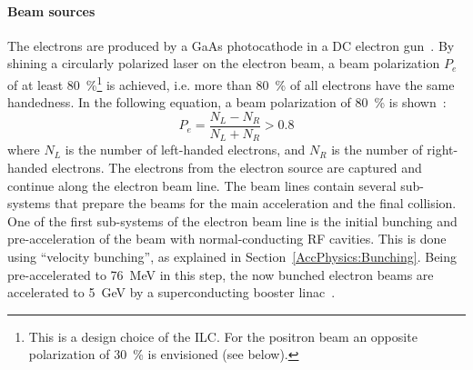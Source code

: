 \paragraph{Beam sources}
The electrons are produced by a GaAs photocathode in a DC electron gun~\cite[p. 13]{TDR32}.
By shining a circularly polarized laser on the electron beam, a beam polarization $P_e$ of at least \SI{80}{\percent}\footnote{This is a design choice of the ILC. For the positron beam an opposite polarization of \SI{30}{\percent} is envisioned (see below).} is achieved, i.e. more than \SI{80}{\percent} of all electrons have the same handedness.
In the following equation, a beam polarization of \SI{80}{\percent} is shown~\cite[p. 81]{TDR32}: 
\begin{equation}
 P_e = \frac{N_L-N_R}{N_L+N_R} > 0.8
\end{equation}
where $N_L$ is the number of left-handed electrons, and $N_R$ is the number of right-handed electrons.
The electrons from the electron source are captured and continue along the electron beam line.
The beam lines contain several sub-systems that prepare the beams for the main acceleration and the final collision.
One of the first sub-systems of the electron beam line is the initial bunching and pre-acceleration of the beam with normal-conducting RF cavities.
This is done using ``velocity bunching'', as explained in Section~\ref{AccPhysics:Bunching}.
Being pre-accelerated to \SI{76}{\MeV} in this step, the now bunched electron beams are accelerated to \SI{5}{\GeV} by a  superconducting booster linac~\cite[p. 81f]{TDR32}.

